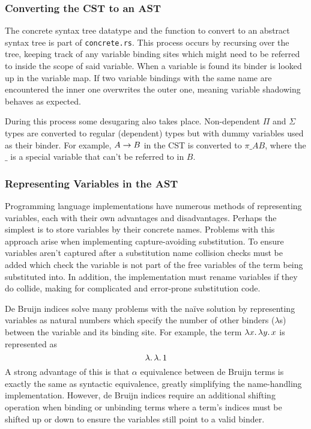 \documentclass[12pt,a4paper,twoside]{report}
\begin{document}
\subsubsection{Converting the CST to an AST}

The concrete syntax tree datatype and the function to convert to an abstract syntax tree is part of \texttt{concrete.rs}.
This process occurs by recursing over the tree, keeping track of any variable binding sites which might need to be referred to inside the scope of said variable.
When a variable is found its binder is looked up in the variable map.
If two variable bindings with the same name are encountered the inner one overwrites the outer one, meaning variable shadowing behaves as expected.

During this process some desugaring also takes place.
Non-dependent \(\Pi\) and \(\Sigma\) types are converted to regular (dependent) types but with dummy variables used as their binder.
For example, \(A \rightarrow B\) in the CST is converted to \(\pi{\_}{A}{B}\), where the \(\_\) is a special variable that can't be referred to in \(B\).

\subsubsection{Representing Variables in the AST}

Programming language implementations have numerous methods of representing variables, each with their own advantages and disadvantages.
Perhaps the simplest is to store variables by their concrete names.
Problems with this approach arise when implementing capture-avoiding substitution.
To ensure variables aren't captured after a substitution name collision checks must be added which check the variable is not part of the free variables of the term being substituted into.
In addition, the implementation must rename variables if they do collide, making for complicated and error-prone substitution code.

De Bruijn indices \cite{debruijn72} solve many problems with the na\"ive solution by representing variables as natural numbers which specify the
number of other binders (\(\lambda\)s) between the variable and its binding site.
For example, the term \(\lambda x \ldotp \lambda y \ldotp x\) is represented as
\[
    \lambda \ldotp \lambda \ldotp 1
\]
A strong advantage of this is that \(\alpha\) equivalence between de Bruijn terms is exactly the same as syntactic equivalence, greatly simplifying the name-handling implementation.
However, de Bruijn indices require an additional shifting operation when binding or unbinding terms where a term's indices must be shifted up or down to ensure the variables still point to a valid binder.
\end{document}
